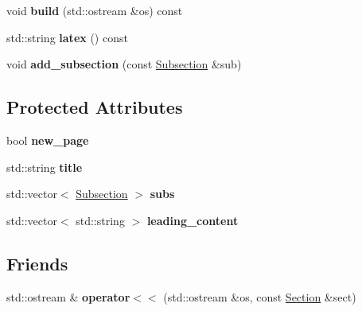 \begin{DoxyCompactItemize}
\item 
\hypertarget{classlatex_1_1doc_1_1Section_aee19d01d31a21de2aa99be24177e23db}{void {\bfseries build} (std\-::ostream \&os) const }\label{classlatex_1_1doc_1_1Section_aee19d01d31a21de2aa99be24177e23db}

\item 
\hypertarget{classlatex_1_1doc_1_1Section_adfc9deb9a224361cd9ab62b8cf293fd4}{std\-::string {\bfseries latex} () const }\label{classlatex_1_1doc_1_1Section_adfc9deb9a224361cd9ab62b8cf293fd4}

\item 
\hypertarget{classlatex_1_1doc_1_1Section_ab6ac21c9c03fec82ad67758d2eef050a}{void {\bfseries add\-\_\-subsection} (const \hyperlink{classlatex_1_1doc_1_1Subsection}{Subsection} \&sub)}\label{classlatex_1_1doc_1_1Section_ab6ac21c9c03fec82ad67758d2eef050a}

\end{DoxyCompactItemize}
\subsection*{Protected Attributes}
\begin{DoxyCompactItemize}
\item 
\hypertarget{classlatex_1_1doc_1_1Section_abf2739ed110a403fc2bec61b98692d4c}{bool {\bfseries new\-\_\-page}}\label{classlatex_1_1doc_1_1Section_abf2739ed110a403fc2bec61b98692d4c}

\item 
\hypertarget{classlatex_1_1doc_1_1Section_af6e7088b15a34c0faf4f60fd97f8a8d6}{std\-::string {\bfseries title}}\label{classlatex_1_1doc_1_1Section_af6e7088b15a34c0faf4f60fd97f8a8d6}

\item 
\hypertarget{classlatex_1_1doc_1_1Section_a0a8b071155892bf86e5e60243b58666b}{std\-::vector$<$ \hyperlink{classlatex_1_1doc_1_1Subsection}{Subsection} $>$ {\bfseries subs}}\label{classlatex_1_1doc_1_1Section_a0a8b071155892bf86e5e60243b58666b}

\item 
\hypertarget{classlatex_1_1doc_1_1Section_a91474f637298d07905279379ff8a36e1}{std\-::vector$<$ std\-::string $>$ {\bfseries leading\-\_\-content}}\label{classlatex_1_1doc_1_1Section_a91474f637298d07905279379ff8a36e1}

\end{DoxyCompactItemize}
\subsection*{Friends}
\begin{DoxyCompactItemize}
\item 
\hypertarget{classlatex_1_1doc_1_1Section_a8326770a980114dff62ba317662cb7a9}{std\-::ostream \& {\bfseries operator$<$$<$} (std\-::ostream \&os, const \hyperlink{classlatex_1_1doc_1_1Section}{Section} \&sect)}\label{classlatex_1_1doc_1_1Section_a8326770a980114dff62ba317662cb7a9}

\end{DoxyCompactItemize}


